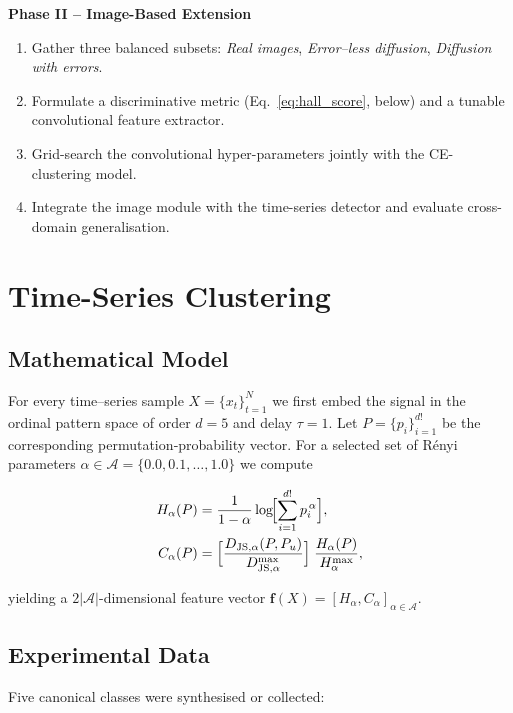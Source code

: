 \documentclass{article}
\begin{document}
\textbf{Phase II – Image-Based Extension}
\begin{enumerate}
\item Gather three balanced subsets: \emph{Real images}, \emph{Error–less
      diffusion}, \emph{Diffusion with errors}.
\item Formulate a discriminative metric
      (Eq.~\ref{eq:hall_score}, below) and a tunable convolutional
      feature extractor.
\item Grid-search the convolutional hyper-parameters jointly with the
      CE-clustering model.
\item Integrate the image module with the time-series detector and
      evaluate cross-domain generalisation.
\end{enumerate}
\section{Time-Series Clustering}\label{sec:results}

\subsection{Mathematical Model}

For every time–series sample \(X=\{x_t\}_{t=1}^{N}\) we first embed the
signal in the ordinal pattern space of order \(d=5\) and delay
\(\tau=1\).  Let \(P=\{p_i\}_{i=1}^{d!}\) be the corresponding
permutation‐probability vector.  For a selected set of Rényi parameters
\(\alpha \in \mathcal{A} = \{0.0,0.1,\dots,1.0\}\) we compute

\begin{align}
H_\alpha(P)
  &=\frac{1}{1-\alpha}\log\!\Bigl[\sum_{i=1}^{d!} p_i^{\,\alpha}\Bigr],\\
C_\alpha(P)
  &=\Bigl[\frac{D_{\mathrm{JS},\alpha}(P,P_u)}%
                 {D^{\max}_{\mathrm{JS},\alpha}}\Bigr]\;
     \frac{H_\alpha(P)}{H^{\max}_\alpha},
\end{align}

yielding a \(2|\mathcal{A}|\)-dimensional feature vector  
\(\mathbf{f}(X)=[H_\alpha,C_\alpha]_{\alpha\in\mathcal{A}}\).

\subsection{Experimental Data}

Five canonical classes were synthesised or collected:
\end{document}
